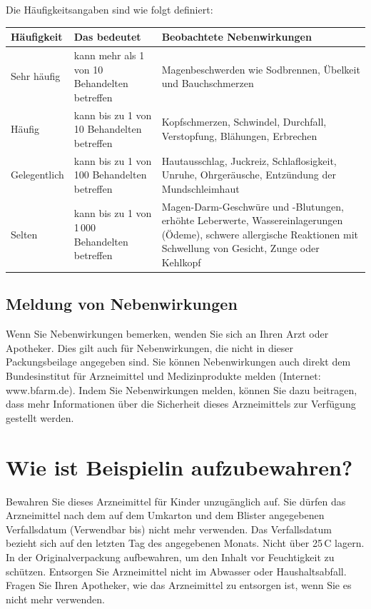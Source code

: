 \documentclass[9.5pt,a4paper]{extarticle}
\begin{document}
Die Häufigkeitsangaben sind wie folgt definiert:

\begin{center}
\small
\begin{tabularx}{\linewidth}{@{}>{\raggedright\arraybackslash}p{2.2cm} >{\raggedright\arraybackslash}p{4.4cm} >{\raggedright\arraybackslash}X@{}}
  \toprule
  \textbf{Häufigkeit} & \textbf{Das bedeutet} & \textbf{Beobachtete Nebenwirkungen} \\
  \midrule
  Sehr häufig & kann mehr als 1 von 10 Behandelten betreffen & Magenbeschwerden wie Sodbrennen, Übelkeit und Bauchschmerzen \\
  \addlinespace[3pt]
  Häufig & kann bis zu 1 von 10 Behandelten betreffen & Kopfschmerzen, Schwindel, Durchfall, Verstopfung, Blähungen, Erbrechen \\
  \addlinespace[3pt]
  Gelegentlich & kann bis zu 1 von 100 Behandelten betreffen & Hautausschlag, Juckreiz, Schlaflosigkeit, Unruhe, Ohrgeräusche, Entzündung der Mundschleimhaut \\
  \addlinespace[3pt]
  Selten & kann bis zu 1 von 1\,000 Behandelten betreffen & Magen-Darm-Geschwüre und -Blutungen, erhöhte Leberwerte, Wassereinlagerungen (Ödeme), schwere allergische Reaktionen mit Schwellung von Gesicht, Zunge oder Kehlkopf \\
  \bottomrule
\end{tabularx}
\end{center}

\subsection*{Meldung von Nebenwirkungen}
Wenn Sie Nebenwirkungen bemerken, wenden Sie sich an Ihren Arzt oder Apotheker. Dies gilt auch für Nebenwirkungen,
die nicht in dieser Packungsbeilage angegeben sind. Sie können Nebenwirkungen auch direkt dem Bundesinstitut für
Arzneimittel und Medizinprodukte melden (Internet: www.bfarm.de). Indem Sie Nebenwirkungen melden, können Sie dazu
beitragen, dass mehr Informationen über die Sicherheit dieses Arzneimittels zur Verfügung gestellt werden.

\section{Wie ist Beispielin aufzubewahren?}
Bewahren Sie dieses Arzneimittel für Kinder unzugänglich auf. Sie dürfen das Arzneimittel nach dem auf dem
Umkarton und dem Blister angegebenen Verfallsdatum (Verwendbar bis) nicht mehr verwenden. Das Verfallsdatum bezieht
sich auf den letzten Tag des angegebenen Monats. Nicht über 25\,\textdegree C lagern. In der Originalverpackung
aufbewahren, um den Inhalt vor Feuchtigkeit zu schützen. Entsorgen Sie Arzneimittel nicht im Abwasser oder
Haushaltsabfall. Fragen Sie Ihren Apotheker, wie das Arzneimittel zu entsorgen ist, wenn Sie es nicht mehr
verwenden.
\end{document}
